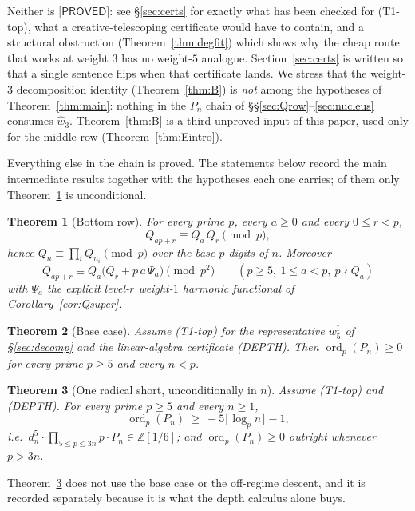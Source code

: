 \documentclass[11pt,reqno]{amsart}
\theoremstyle{plain}
\newtheorem{theorem}{Theorem}[section]
\theoremstyle{definition}
\theoremstyle{remark}
\numberwithin{equation}{section}
\newcommand{\ZZ}{\mathbb{Z}}
\newcommand{\ord}{\operatorname{ord}}
\newcommand{\wthree}{\hat w_3}
\newcommand{\PROVED}{\textsf{[PROVED]}}
\begin{document}
Neither is $\PROVED$: see \S\ref{sec:certs} for exactly what has
been checked for (T1-top), what a creative-telescoping certificate would have to contain, and a
structural obstruction (Theorem~\ref{thm:degfit}) which shows why the cheap route that works at
weight $3$ has no weight-$5$ analogue. Section~\ref{sec:certs} is written so that a single
sentence flips when that certificate lands. We stress that the weight-$3$ decomposition
identity (Theorem~\ref{thm:B}) is \emph{not} among the hypotheses of
Theorem~\ref{thm:main}: nothing in the $P_n$ chain of \S\S\ref{sec:Qrow}--\ref{sec:nucleus}
consumes $\wthree$. Theorem~\ref{thm:B} is a third unproved input of this paper, used only for
the middle row (Theorem~\ref{thm:Eintro}).

Everything else in the chain is proved. The statements below record the main intermediate
results together with the hypotheses each one carries; of them only
Theorem~\ref{thm:Aintro} is unconditional.

\begin{theorem}[Bottom row]\label{thm:Aintro}
For every prime $p$, every $a\ge0$ and every $0\le r<p$,
\[
Q_{ap+r}\equiv Q_a\,Q_r \pmod p,
\]
hence $Q_n\equiv\prod_i Q_{n_i}\pmod p$ over the base-$p$ digits of $n$. Moreover
\[
Q_{ap+r}\equiv Q_a\bigl(Q_r+p\,a\,\Psi_a\bigr)\pmod{p^2}\qquad(p\ge5,\ 1\le a<p,\ p\nmid Q_a)
\]
with $\Psi_a$ the explicit level-$r$ weight-$1$ harmonic functional of
Corollary~\textup{\ref{cor:Qsuper}}.
\end{theorem}

\begin{theorem}[Base case]\label{thm:baseintro}
Assume \textup{(T1-top)} for the representative $w_5^{\mathrm I}$ of \S\ref{sec:decomp} and the
linear-algebra certificate \textup{(DEPTH)}. Then $\ord_p(P_n)\ge0$ for every prime $p\ge5$
and every $n<p$.
\end{theorem}

\begin{theorem}[One radical short, unconditionally in $n$]\label{thm:51intro}
Assume \textup{(T1-top)} and \textup{(DEPTH)}. For every prime $p\ge5$ and every $n\ge1$,
\[
\ord_p(P_n)\ \ge\ -5\lfloor\log_p n\rfloor-1,
\]
i.e.\ $d_n^5\cdot\!\!\prod_{5\le p\le3n}\!\!p\cdot P_n\in\ZZ[1/6]$; and $\ord_p(P_n)\ge0$
outright whenever $p>3n$.
\end{theorem}

Theorem~\ref{thm:51intro} does not use the base case or the off-regime descent, and it is
recorded separately because it is what the depth calculus alone buys.
\end{document}
